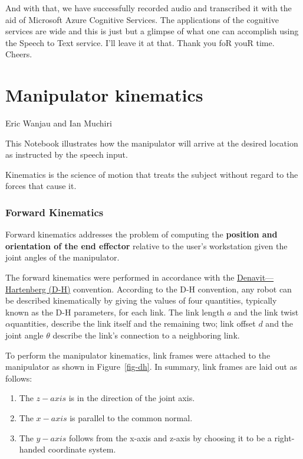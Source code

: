 \documentclass[
  letterpaper,
  DIV=11,
  numbers=noendperiod]{scrreprt}
\providecommand{\tightlist}{%
  \setlength{\itemsep}{0pt}\setlength{\parskip}{0pt}}\usepackage{longtable,booktabs,array}
\begin{document}
And with that, we have successfully recorded audio and transcribed it
with the aid of Microsoft Azure Cognitive Services. The applications of
the cognitive services are wide and this is just but a glimpse of what
one can accomplish using the Speech to Text service. I'll leave it at
that. Thank you foR youR time. Cheers.


\hypertarget{manipulator-kinematics}{%
\chapter{Manipulator kinematics}\label{manipulator-kinematics}}

Eric Wanjau and Ian Muchiri

\hfill\break

This Notebook illustrates how the manipulator will arrive at the desired
location as instructed by the speech input.

Kinematics is the science of motion that treats the subject without
regard to the forces that cause it.

\hypertarget{forward-kinematics}{%
\subsection{Forward Kinematics}\label{forward-kinematics}}

Forward kinematics addresses the problem of computing the
\textbf{position and orientation of the end effector} relative to the
user's workstation given the joint angles of the manipulator.

The forward kinematics were performed in accordance with the
\href{https://en.wikipedia.org/wiki/Denavit\%E2\%80\%93Hartenberg_parameters}{Denavit---Hartenberg
(D-H)} convention. According to the D-H convention, any robot can be
described kinematically by giving the values of four quantities,
typically known as the D-H parameters, for each link. The link length
\(a\) and the link twist \(\alpha\)quantities\emph{,} describe the link
itself and the remaining two; link offset \(d\) and the joint angle
\(\theta\) describe the link's connection to a neighboring link.

To perform the manipulator kinematics, link frames were attached to the
manipulator as shown in Figure~\ref{fig-dh}. In summary, link frames are
laid out as follows:

\begin{enumerate}
\def\labelenumi{\arabic{enumi}.}
\tightlist
\item
  The \(z-axis\) is in the direction of the joint axis.
\item
  The \(x-axis\) is parallel to the common normal.
\item
  The \(y-axis\) follows from the x-axis and z-axis by choosing it to be
  a right-handed coordinate system.
\end{enumerate}
\end{document}
